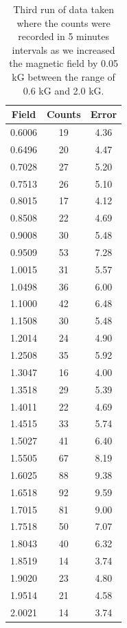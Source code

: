 \begin{table}
\begin{tabular}{|c|c|c|} \hline
Field	&	Counts	&	Error	\\ \hline
0.6006	&	19	&	4.36	\\ \hline
0.6496	&	20	&	4.47	\\ \hline
0.7028	&	27	&	5.20	\\ \hline
0.7513	&	26	&	5.10	\\ \hline
0.8015	&	17	&	4.12	\\ \hline
0.8508	&	22	&	4.69	\\ \hline
0.9008	&	30	&	5.48	\\ \hline
0.9509	&	53	&	7.28	\\ \hline
1.0015	&	31	&	5.57	\\ \hline
1.0498	&	36	&	6.00	\\ \hline
1.1000	&	42	&	6.48	\\ \hline
1.1508	&	30	&	5.48	\\ \hline
1.2014	&	24	&	4.90	\\ \hline
1.2508	&	35	&	5.92	\\ \hline
1.3047	&	16	&	4.00	\\ \hline
1.3518	&	29	&	5.39	\\ \hline
1.4011	&	22	&	4.69	\\ \hline
1.4515	&	33	&	5.74	\\ \hline
1.5027	&	41	&	6.40	\\ \hline
1.5505	&	67	&	8.19	\\ \hline
1.6025	&	88	&	9.38	\\ \hline
1.6518	&	92	&	9.59	\\ \hline
1.7015	&	81	&	9.00	\\ \hline
1.7518	&	50	&	7.07	\\ \hline
1.8043	&	40	&	6.32	\\ \hline
1.8519	&	14	&	3.74	\\ \hline
1.9020	&	23	&	4.80	\\ \hline
1.9514	&	21	&	4.58	\\ \hline
2.0021	&	14	&	3.74	\\ \hline
\end{tabular}
\caption{Third run of data taken where the counts were recorded in 5 minutes intervals as we increased the magnetic field by 0.05 kG between the range of 0.6 kG and 2.0 kG.}
\end{table}

